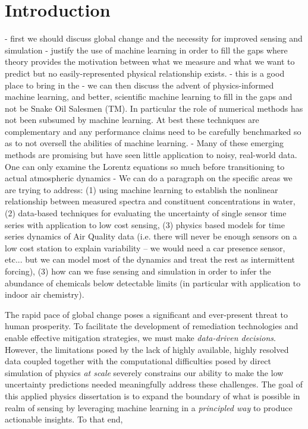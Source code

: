 \chapter{Introduction}




- first we should discuss global change and the necessity for improved sensing and simulation
- justify the use of machine learning in order to fill the gaps where theory provides the motivation between what we measure and what we want to predict but no easily-represented physical relationship exists.
- this is a good place to bring in the
- we can then discuss the advent of physics-informed machine learning, and better, scientific machine learning to fill in the gaps and not be Snake Oil Salesmen (TM). In particular the role of numerical methods has not been subsumed by machine learning. At best these techniques are complementary and any performance claims need to be carefully benchmarked so as to not oversell the abilities of machine learning.
- Many of these emerging methods are promising but have seen little application to noisy, real-world data. One can only examine the Lorentz equations so much before transitioning to actual atmospheric dynamics
- We can do a paragraph on the specific areas we are trying to address: (1) using machine learning to establish the nonlinear relationship between measured spectra and constituent concentrations in water, (2) data-based techniques for evaluating the uncertainty of single sensor time series with application to low cost sensing, (3) physics based models for time series dynamics of Air Quality data (i.e. there will never be enough sensors on a low cost station to explain variability -- we would need a car presence sensor, etc... but we can model most of the dynamics and treat the rest as intermittent forcing), (3) how can we fuse sensing and simulation in order to infer the abundance of chemicals below detectable limits (in particular with application to indoor air chemistry).





The rapid pace of global change poses a significant and ever-present threat to human prosperity. To facilitate the development of remediation technologies and enable effective mitigation strategies, we must make \textit{data-driven decisions}. However, the limitations posed by the lack of highly available, highly resolved data coupled together with the computational difficulties posed by direct simulation of physics \textit{at scale} severely constrains our ability to make the low uncertainty predictions needed meaningfully address these challenges. The goal of this applied physics dissertation is to expand the boundary of what is possible in realm of sensing by leveraging machine learning in a \textit{principled way} to produce actionable insights. To that end, 

